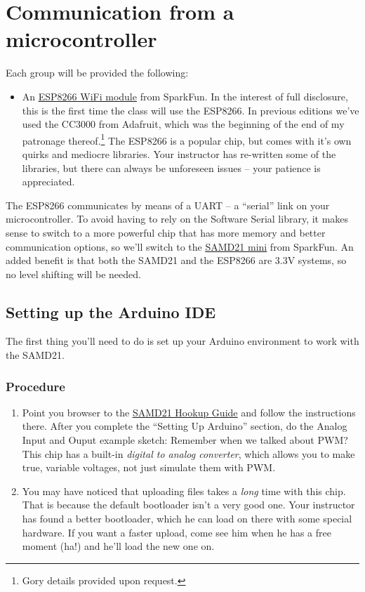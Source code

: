\documentclass[11pt]{article} %
\begin{document}
\section*{Communication from a microcontroller}

Each group will be provided the following:
\begin{itemize}
\item An \href{https://www.sparkfun.com/products/13678}{\underline{ESP8266 WiFi module}} from SparkFun. In the interest of full disclosure, this is the first time the class will use the ESP8266. In previous editions we’ve used the CC3000 from Adafruit, which was the beginning of the end of my patronage thereof.\footnote{Gory details provided upon request.} The ESP8266 is a popular chip, but comes with it’s own quirks and mediocre libraries. Your instructor has re-written some of the libraries, but there can always be unforeseen issues -- your patience is appreciated.
\end{itemize}

The ESP8266 communicates by means of a UART -- a “serial” link on your microcontroller. To avoid having to rely on the Software Serial library, it makes sense to switch to a more powerful chip that has more memory and better communication options, so we’ll switch to the  \href{https://www.sparkfun.com/products/13664}{\underline{SAMD21 mini}} from SparkFun. An added benefit is that both the SAMD21 and the ESP8266 are 3.3V systems, so no level shifting will be needed.

\subsection*{Setting up the Arduino IDE}

The first thing you’ll need to do is set up your Arduino environment to work with the SAMD21.

\subsubsection*{Procedure}

\begin{enumerate}
\item Point you browser to the \href{https://learn.sparkfun.com/tutorials/samd21-minidev-breakout-hookup-guide}{\underline{SAMD21 Hookup Guide}} and follow the instructions there. After you complete the “Setting Up Arduino” section, do the Analog Input and Ouput example sketch: Remember when we talked about PWM? This chip has a built-in \emph{digital to analog converter}, which allows you to make true, variable voltages, not just simulate them with PWM.
\item You may have noticed that uploading files takes a \emph{long} time with this chip. That is because the default bootloader isn’t a very good one. Your instructor has found a better bootloader, which he can load on there with some special hardware. If you want a faster upload, come see him when he has a free moment (ha!) and he’ll load the new one on.
\end{enumerate}
\end{document}

